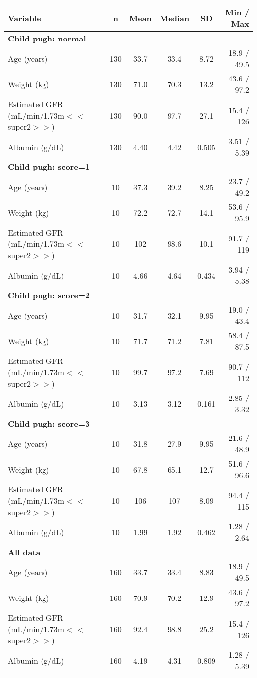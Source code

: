 \setlength{\tabcolsep}{5pt} 
\begin{threeparttable}
\renewcommand{\arraystretch}{1.3}
\begin{tabular}[h]{lccccr}
\hline
Variable & n & Mean & Median & SD & Min / Max \\
\hline
\multicolumn{6}{l}{\textbf{Child pugh: normal}}\\%
Age (years) & 130 & 33.7 & 33.4 & 8.72 & 18.9 / 49.5 \\
Weight (kg) & 130 & 71.0 & 70.3 & 13.2 & 43.6 / 97.2 \\
Estimated GFR (mL/min/1.73m$<$$<$super2$>$$>$) & 130 & 90.0 & 97.7 & 27.1 & 15.4 / 126 \\
Albumin (g/dL) & 130 & 4.40 & 4.42 & 0.505 & 3.51 / 5.39 \\
\hline \multicolumn{6}{l}{\textbf{Child pugh: score=1}}\\%
Age (years) & 10 & 37.3 & 39.2 & 8.25 & 23.7 / 49.2 \\
Weight (kg) & 10 & 72.2 & 72.7 & 14.1 & 53.6 / 95.9 \\
Estimated GFR (mL/min/1.73m$<$$<$super2$>$$>$) & 10 & 102 & 98.6 & 10.1 & 91.7 / 119 \\
Albumin (g/dL) & 10 & 4.66 & 4.64 & 0.434 & 3.94 / 5.38 \\
\hline \multicolumn{6}{l}{\textbf{Child pugh: score=2}}\\%
Age (years) & 10 & 31.7 & 32.1 & 9.95 & 19.0 / 43.4 \\
Weight (kg) & 10 & 71.7 & 71.2 & 7.81 & 58.4 / 87.5 \\
Estimated GFR (mL/min/1.73m$<$$<$super2$>$$>$) & 10 & 99.7 & 97.2 & 7.69 & 90.7 / 112 \\
Albumin (g/dL) & 10 & 3.13 & 3.12 & 0.161 & 2.85 / 3.32 \\
\hline \multicolumn{6}{l}{\textbf{Child pugh: score=3}}\\%
Age (years) & 10 & 31.8 & 27.9 & 9.95 & 21.6 / 48.9 \\
Weight (kg) & 10 & 67.8 & 65.1 & 12.7 & 51.6 / 96.6 \\
Estimated GFR (mL/min/1.73m$<$$<$super2$>$$>$) & 10 & 106 & 107 & 8.09 & 94.4 / 115 \\
Albumin (g/dL) & 10 & 1.99 & 1.92 & 0.462 & 1.28 / 2.64 \\
\hline \multicolumn{6}{l}{\textbf{All data}}\\%
Age (years) & 160 & 33.7 & 33.4 & 8.83 & 18.9 / 49.5 \\
Weight (kg) & 160 & 70.9 & 70.2 & 12.9 & 43.6 / 97.2 \\
Estimated GFR (mL/min/1.73m$<$$<$super2$>$$>$) & 160 & 92.4 & 98.8 & 25.2 & 15.4 / 126 \\
Albumin (g/dL) & 160 & 4.19 & 4.31 & 0.809 & 1.28 / 5.39 \\
\hline
\end{tabular}
\end{threeparttable}
 
